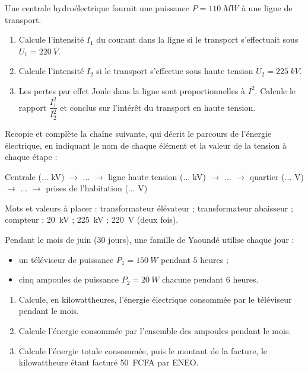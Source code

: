 \documentclass[11pt]{article}
\begin{document}
\begin{exercice}
Une centrale hydroélectrique fournit une puissance $P = \SI{110}{MW}$ à une ligne de transport.
\begin{enumerate}
\item Calcule l'intensité $I_1$ du courant dans la ligne si le transport s'effectuait sous $U_1 = \SI{220}{V}$.
\item Calcule l'intensité $I_2$ si le transport s'effectue sous haute tension $U_2 = \SI{225}{kV}$.
\item Les pertes par effet Joule dans la ligne sont proportionnelles à $I^2$. Calcule le rapport $\dfrac{I_1^2}{I_2^2}$ et conclus sur l'intérêt du transport en haute tension.
\end{enumerate}
\end{exercice}

\begin{exercice}
Recopie et complète la chaîne suivante, qui décrit le parcours de l'énergie électrique, en indiquant le nom de chaque élément et la valeur de la tension à chaque étape :
\begin{center}
Centrale ($\ldots$ kV) $\longrightarrow$ $\ldots$ $\longrightarrow$ ligne haute tension ($\ldots$ kV) $\longrightarrow$ $\ldots$ $\longrightarrow$ quartier ($\ldots$ V) $\longrightarrow$ $\ldots$ $\longrightarrow$ prises de l'habitation ($\ldots$ V)
\end{center}
Mots et valeurs à placer : transformateur élévateur ; transformateur abaisseur ; compteur ; \SI{20}{kV} ; \SI{225}{kV} ; \SI{220}{V} (deux fois).
\end{exercice}

\begin{exercice}
Pendant le mois de juin (30 jours), une famille de Yaoundé utilise chaque jour :
\begin{itemize}
\item un téléviseur de puissance $P_1 = \SI{150}{W}$ pendant $5$ heures ;
\item cinq ampoules de puissance $P_2 = \SI{20}{W}$ chacune pendant $6$ heures.
\end{itemize}
\begin{enumerate}
\item Calcule, en kilowattheures, l'énergie électrique consommée par le téléviseur pendant le mois.
\item Calcule l'énergie consommée par l'ensemble des ampoules pendant le mois.
\item Calcule l'énergie totale consommée, puis le montant de la facture, le kilowattheure étant facturé \SI{50}{FCFA} par ENEO.
\end{enumerate}
\end{exercice}
\end{document}
